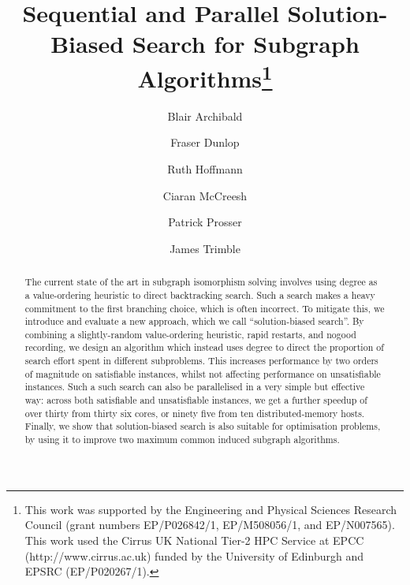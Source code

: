 \documentclass[runningheads]{llncs}
\begin{document}
\title{Sequential and Parallel Solution-Biased Search for Subgraph Algorithms\thanks{This work was
supported by the Engineering and Physical Sciences Research Council (grant numbers EP/P026842/1,
EP/M508056/1, and EP/N007565). This work used the Cirrus UK National Tier-2 HPC Service at EPCC
(http://www.cirrus.ac.uk) funded by the University of Edinburgh and EPSRC (EP/P020267/1).}}

\author{Blair Archibald\and
Fraser Dunlop\and
Ruth Hoffmann\and
Ciaran McCreesh\and
Patrick Prosser \and
James Trimble}



\maketitle

\begin{abstract}
    The current state of the art in subgraph isomorphism solving involves using degree as a
    value-ordering heuristic to direct backtracking search. Such a search makes a heavy commitment
    to the first branching choice, which is often incorrect. To mitigate this, we introduce and
    evaluate a new approach, which we call ``solution-biased search''. By combining a
    slightly-random value-ordering heuristic, rapid restarts, and nogood recording, we design an
    algorithm which instead uses degree to direct the proportion of search effort spent in different
    subproblems. This increases performance by two orders of magnitude on satisfiable instances,
    whilst not affecting performance on unsatisfiable instances. Such a such search can also be
    parallelised in a very simple but effective way: across both satisfiable and unsatisfiable
    instances, we get a further speedup of over thirty from thirty six cores, or ninety five from
    ten distributed-memory hosts. Finally, we show that solution-biased search is also suitable for
    optimisation problems, by using it to improve two maximum common induced subgraph algorithms.
\end{abstract}
\end{document}
